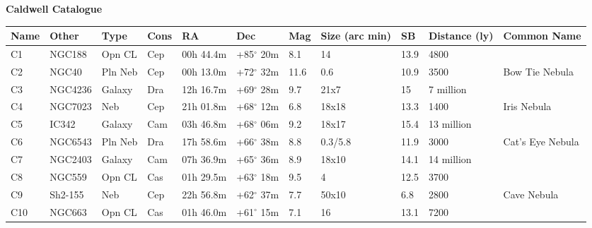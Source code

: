 \documentclass[10pt,twoside,a4paper,english]{article}
\begin{document}
 
 
 
 
 
 
\newpage 
\noindent 
 
{\bf Caldwell Catalogue}  
\begin{longtable}{@{}lllllllllll@{}} 
\hline 
{\bf Name} & {\bf Other} & {\bf Type} & {\bf Cons} & {\bf RA}  & {\bf Dec} & {\bf Mag} & {\bf Size (arc min)} & {\bf SB} & {\bf Distance (ly)} & {\bf Common Name}               \\ 
\hline 
C1         & NGC188      & Opn CL     & Cep       & 00h 44.4m & +85$^{\circ}$ 20m  & 8.1       & 14                   & 13.9     & 4800                &                                 \\ 
C2         & NGC40       & Pln Neb    & Cep       & 00h 13.0m & +72$^{\circ}$ 32m  & 11.6      & 0.6                  & 10.9     & 3500                & Bow Tie Nebula                  \\ 
C3         & NGC4236     & Galaxy     & Dra       & 12h 16.7m & +69$^{\circ}$ 28m  & 9.7       & 21x7                 & 15       & 7 million           &                                 \\ 
C4         & NGC7023     & Neb        & Cep       & 21h 01.8m & +68$^{\circ}$ 12m  & 6.8       & 18x18                & 13.3     & 1400                & Iris Nebula                     \\ 
C5         & IC342       & Galaxy     & Cam       & 03h 46.8m & +68$^{\circ}$ 06m  & 9.2       & 18x17                & 15.4     & 13 million          &                                 \\ 
C6         & NGC6543     & Pln Neb    & Dra       & 17h 58.6m & +66$^{\circ}$ 38m  & 8.8       & 0.3/5.8              & 11.9     & 3000                & Cat's Eye Nebula                \\ 
C7         & NGC2403     & Galaxy     & Cam       & 07h 36.9m & +65$^{\circ}$ 36m  & 8.9       & 18x10                & 14.1     & 14 million          &                                 \\ 
C8         & NGC559      & Opn CL     & Cas       & 01h 29.5m & +63$^{\circ}$ 18m  & 9.5       & 4                    & 12.5     & 3700                &                                 \\ 
C9         & Sh2-155     & Neb        & Cep       & 22h 56.8m & +62$^{\circ}$ 37m  & 7.7       & 50x10                & 6.8      & 2800                & Cave Nebula                     \\ 
C10        & NGC663      & Opn CL     & Cas       & 01h 46.0m & +61$^{\circ}$ 15m  & 7.1       & 16                   & 13.1     & 7200                &                                 \\ 

\end{longtable}
\end{document}

